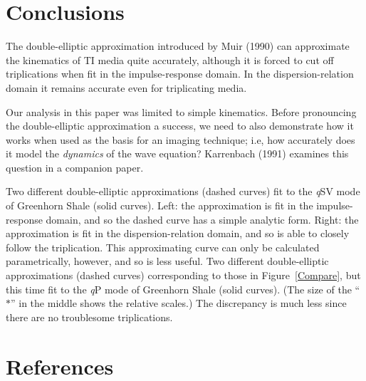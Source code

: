 \section{Conclusions}
The double-elliptic approximation introduced by Muir (1990) can approximate 
the kinematics of TI media quite accurately, although it is forced
to cut off triplications when fit in the impulse-response domain.
In the dispersion-relation domain it remains accurate even for
triplicating media.

Our analysis in this paper was limited to simple kinematics.
Before pronouncing the double-elliptic approximation
a success, we need to also demonstrate how it
works when used as the basis for an imaging technique;
i.e, how accurately does it model the {\em dynamics\/} of the wave 
equation? Karrenbach (1991) examines this question in a companion paper.

{
Two different double-elliptic approximations (dashed curves) fit
to the {\sl q}SV mode of Greenhorn Shale (solid curves).
Left: the approximation is fit in the impulse-response domain, and
so the dashed curve has a simple analytic form.
Right: the approximation is fit in the dispersion-relation domain, and
so is able to closely follow the triplication. This approximating
curve can only be calculated parametrically, however, and so is less useful.
}
{
Two different double-elliptic approximations (dashed curves) corresponding
to those in Figure~\protect\ref{Compare}, but this time fit
to the {\sl q}P mode of Greenhorn Shale (solid curves). (The size of the
``$*$'' in the middle shows the relative scales.)
The discrepancy is much less since there are no troublesome triplications.
}

\section{References}
